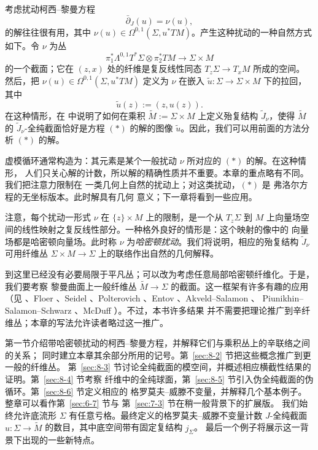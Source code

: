 
考虑扰动柯西--黎曼方程
\begin{equation*}
  \tag{$*$}
  \bar\partial_J(u)=\nu(u),
\end{equation*}
的解往往很有用，其中 $\nu(u)\in\Omega^{0,1}(\Sigma,u^*TM)$。产生这种扰动的一种自然方式
如下。令 $\nu$ 为丛
\[
  \pi_1^*\Lambda^{0,1}T^*\Sigma\otimes\pi_2^*TM
  \longrightarrow \Sigma\times M
\]
的一个截面；它在 $(z,x)$ 处的纤维是复反线性同态 $T_z\Sigma\to T_xM$ 所成的空间。
然后，把 $\nu(u)\in\Omega^{0,1}(\Sigma,u^*TM)$ 定义为 $\nu$ 在嵌入
$\widetilde u:\Sigma\to\Sigma\times M$ 下的拉回，其中
\[
  \widetilde u(z):=(z,u(z)).
\]
在这种情形，在  中说明了如何在乘积
$\widetilde M:=\Sigma\times M$ 上定义殆复结构 $\widetilde J_\nu$，使得
$\widetilde M$ 的 $\widetilde J_\nu$-全纯截面恰好是方程 $(*)$ 的解的图像
$\widetilde u$。因此，我们可以用前面的方法分析 $(*)$ 的解。

虚模循环通常构造为：其元素是某个一般扰动 $\nu$ 所对应的 $(*)$ 的解。在这种情形，
人们只关心解的计数，所以解的精确性质并不重要。本章的重点略有不同。我们把注意力限制在
一类几何上自然的扰动上；对这类扰动，$(*)$ 是 弗洛尔方程的无坐标版本。此时解具有几何
意义；下一章将看到一些应用。

注意，每个扰动一形式 $\nu$ 在 $\{z\}\times M$ 上的限制，是一个从 $T_z\Sigma$ 到
$M$ 上向量场空间的线性映射之复反线性部分。一种格外良好的情形是：这个映射的像中的
向量场都是哈密顿向量场。此时称 $\nu$ 为\emph{哈密顿扰动}。我们将说明，相应的殆复结构
$\widetilde J_\nu$ 可用纤维丛 $\Sigma\times M\to\Sigma$ 上的联络作出自然的几何解释。

到这里已经没有必要局限于平凡丛；可以改为考虑任意局部哈密顿纤维化。于是，我们要考察
黎曼曲面上一般纤维丛 $\widetilde M\to\Sigma$ 的截面。这一框架有许多有趣的应用（见
、Floer
、Seidel 、Polterovich
、Entov 、Akveld--Salamon 、
Piunikhin--Salamon--Schwarz 、McDuff ）。不过，本书许多结果
并不需要把理论推广到辛纤维丛；本章的写法允许读者略过这一推广。

第一节介绍带哈密顿扰动的柯西--黎曼方程，并解释它们与乘积丛上的辛联络之间的关系；
同时建立本章其余部分所用的记号。第~\ref{sec:8-2} 节把这些概念推广到更一般的纤维丛。
第~\ref{sec:8-3} 节讨论全纯截面的模空间，并概述相应横截性结果的证明。第~\ref{sec:8-4} 节考察
纤维中的全纯球面，第~\ref{sec:8-5} 节引入伪全纯截面的伪循环。第~\ref{sec:8-6} 节定义相应的
格罗莫夫--威滕不变量，并解释几个基本例子。整章可以看作第~\ref{sec:6-7} 节与
第~\ref{sec:7-3} 节在稍一般背景下的扩展版。
我们始终允许底流形 $\Sigma$ 有任意亏格。最终定义的格罗莫夫--威滕不变量计数
$J$-全纯截面 $u:\Sigma\to\widetilde M$ 的数目，其中底空间带有固定复结构 $j_\Sigma$。
最后一个例子将展示这一背景下出现的一些新特点。

